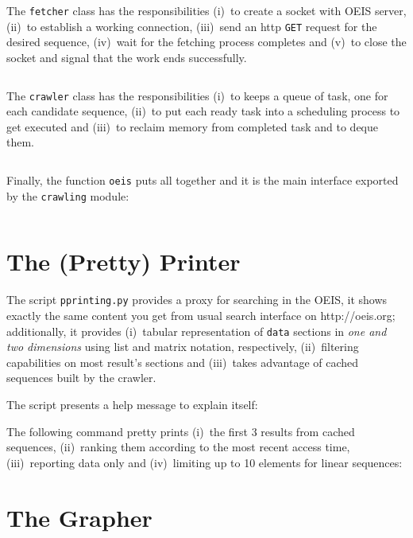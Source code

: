 The \verb|fetcher| class has the responsibilities (i)~to create a socket with
OEIS server, (ii)~to establish a working connection, (iii)~send an http
\verb|GET| request for the desired sequence, (iv)~wait for the fetching process
completes and (v)~to close the socket and signal that the work ends
successfully.
\inputminted[fontsize=\small,stripnl=false,firstline=41,lastline=86]
    {python}{deps/oeis-tools/src/crawling.py}

The \verb|crawler| class has the responsibilities 
(i)~to keeps a queue of task, one for each candidate sequence, 
(ii)~to put each ready task into a scheduling process to get executed and
(iii)~to reclaim memory from completed task and to deque them.
\inputminted[fontsize=\small,stripnl=false,firstline=89,lastline=117]
    {python}{deps/oeis-tools/src/crawling.py}

Finally, the function \verb|oeis| puts all together and it is the main
interface exported by the \verb|crawling| module:
\inputminted[fontsize=\small,stripnl=false,firstline=195,lastline=221]
    {python}{deps/oeis-tools/src/crawling.py}

\section{The (Pretty) Printer}

The script \verb|pprinting.py| provides a proxy for searching in the OEIS, it
shows exactly the same content you get from usual search interface on
http://oeis.org; additionally, it provides (i)~tabular representation of
\verb|data| sections in \textit{one and two dimensions} using list and matrix
notation, respectively, (ii)~filtering capabilities on most result's sections
and (iii)~takes advantage of cached sequences built by the crawler.

The script presents a help message to explain itself:


The following command pretty prints (i)~the first 3 results from cached
sequences, (ii)~ranking them according to the most recent access time,
(iii)~reporting data only and (iv)~limiting up to 10 elements for linear
sequences:


\section{The Grapher}

